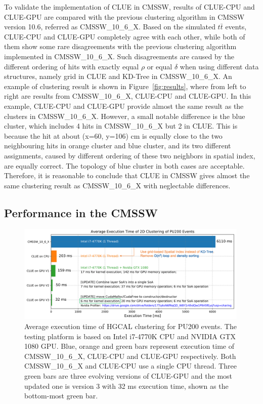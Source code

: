 To validate the implementation of CLUE in CMSSW, results of CLUE-CPU and CLUE-GPU are compared with the previous clustering algorithm in CMSSW version 10.6, referred as CMSSW\_10\_6\_X. Based on the simulated $t\bar{t}$ events, CLUE-CPU and CLUE-GPU completely agree with each other, while both of them show some rare disagreements with the previous clustering algorithm implemented in CMSSW\_10\_6\_X. Such disagreements are caused by the different ordering of hits with exactly equal $\rho$ or equal $\delta$ when using different data structures, namely grid in CLUE and KD-Tree in CMSSW\_10\_6\_X. An example of clustering result is shown in Figure~\ref{fig:results}, where from left to right are results from CMSSW\_10\_6\_X, CLUE-CPU and CLUE-GPU. In this example, CLUE-CPU and CLUE-GPU provide almost the same result as the clusters in CMSSW\_10\_6\_X. However, a small notable difference is the blue cluster, which includes 4 hits in CMSSW\_10\_6\_X but 2 in CLUE. This is because the hit at about (x=60, y=106) cm is equally close to the two neighbouring hits in orange cluster and blue cluster, and its two different assignments, caused by different ordering of these two neighbors in spatial index, are equally correct. The topology of blue cluster in both cases are acceptable. Therefore, it is reasonable to conclude that CLUE in CMSSW gives almost the same clustering result as CMSSW\_10\_6\_X with neglectable differences.





\subsection{Performance in the CMSSW}


\begin{figure}[ht]
    \centering
    \includegraphics[trim=0cm 0cm 0cm 0cm, clip,width=0.99\textwidth]{chapters/HGCal/figures/chep/performance.png}
    \caption{ 
    Average execution time of HGCAL clustering for PU200 events. The testing platform is based on Intel i7-4770K CPU and NVIDIA GTX 1080 GPU. Blue, orange and green bars represent execution time of CMSSW\_10\_6\_X, CLUE-CPU and CLUE-GPU respectively. Both CMSSW\_10\_6\_X and CLUE-CPU use a single CPU thread. Three green bars are three evolving versions of CLUE-GPU and the most updated one is version 3 with 32 ms execution time, shown as the bottom-most green bar.
    }
    \label{fig:performance}
\end{figure}

